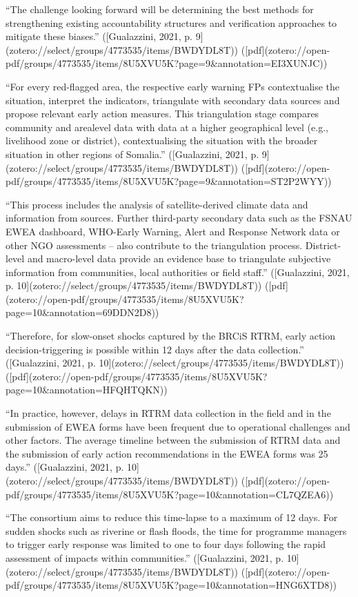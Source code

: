 {“The challenge looking forward will be determining the best methods for strengthening existing accountability structures and verification approaches to mitigate these biases.” ([Gualazzini, 2021, p. 9](zotero://select/groups/4773535/items/BWDYDL8T)) ([pdf](zotero://open-pdf/groups/4773535/items/8U5XVU5K?page=9&annotation=EI3XUNJC))

“For every red-flagged area, the respective early warning FPs contextualise the situation, interpret the indicators, triangulate with secondary data sources and propose relevant early action measures. This triangulation stage compares community and arealevel data with data at a higher geographical level (e.g., livelihood zone or district), contextualising the situation with the broader situation in other regions of Somalia.” ([Gualazzini, 2021, p. 9](zotero://select/groups/4773535/items/BWDYDL8T)) ([pdf](zotero://open-pdf/groups/4773535/items/8U5XVU5K?page=9&annotation=ST2P2WYY))

“This process includes the analysis of satellite-derived climate data and information from sources. Further third-party secondary data such as the FSNAU EWEA dashboard, WHO-Early Warning, Alert and Response Network data or other NGO assessments – also contribute to the triangulation process. District-level and macro-level data provide an evidence base to triangulate subjective information from communities, local authorities or field staff.” ([Gualazzini, 2021, p. 10](zotero://select/groups/4773535/items/BWDYDL8T)) ([pdf](zotero://open-pdf/groups/4773535/items/8U5XVU5K?page=10&annotation=69DDN2D8))

“Therefore, for slow-onset shocks captured by the BRCiS RTRM, early action decision-triggering is possible within 12 days after the data collection.” ([Gualazzini, 2021, p. 10](zotero://select/groups/4773535/items/BWDYDL8T)) ([pdf](zotero://open-pdf/groups/4773535/items/8U5XVU5K?page=10&annotation=HFQHTQKN))

“In practice, however, delays in RTRM data collection in the field and in the submission of EWEA forms have been frequent due to operational challenges and other factors. The average timeline between the submission of RTRM data and the submission of early action recommendations in the EWEA forms was 25 days.” ([Gualazzini, 2021, p. 10](zotero://select/groups/4773535/items/BWDYDL8T)) ([pdf](zotero://open-pdf/groups/4773535/items/8U5XVU5K?page=10&annotation=CL7QZEA6))

“The consortium aims to reduce this time-lapse to a maximum of 12 days. For sudden shocks such as riverine or flash floods, the time for programme managers to trigger early response was limited to one to four days following the rapid assessment of impacts within communities.” ([Gualazzini, 2021, p. 10](zotero://select/groups/4773535/items/BWDYDL8T)) ([pdf](zotero://open-pdf/groups/4773535/items/8U5XVU5K?page=10&annotation=HNG6XTD8))


}
